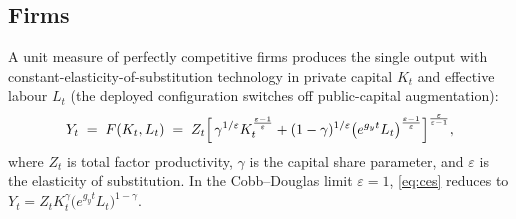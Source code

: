 \subsection{Firms}
\label{subsec:firms}

A unit measure of perfectly competitive firms produces the single output with constant-elasticity-of-substitution technology in private capital $K_t$ and effective labour $L_t$ (the deployed configuration switches off public-capital augmentation):
\begin{equation}
\label{eq:ces}
Y_t \;=\; F(K_t,L_t) \;=\; Z_t\Bigl[\,\gamma^{1/\varepsilon} K_t^{\frac{\varepsilon-1}{\varepsilon}}
+ (1-\gamma)^{1/\varepsilon}\bigl(e^{g_y t} L_t\bigr)^{\frac{\varepsilon-1}{\varepsilon}}\Bigr]^{\frac{\varepsilon}{\varepsilon-1}},
\end{equation}
where $Z_t$ is total factor productivity, $\gamma$ is the capital share parameter, and $\varepsilon$ is the elasticity of substitution. In the Cobb--Douglas limit $\varepsilon = 1$, \eqref{eq:ces} reduces to $Y_t = Z_t K_t^{\gamma}\bigl(e^{g_y t}L_t\bigr)^{1-\gamma}$.

